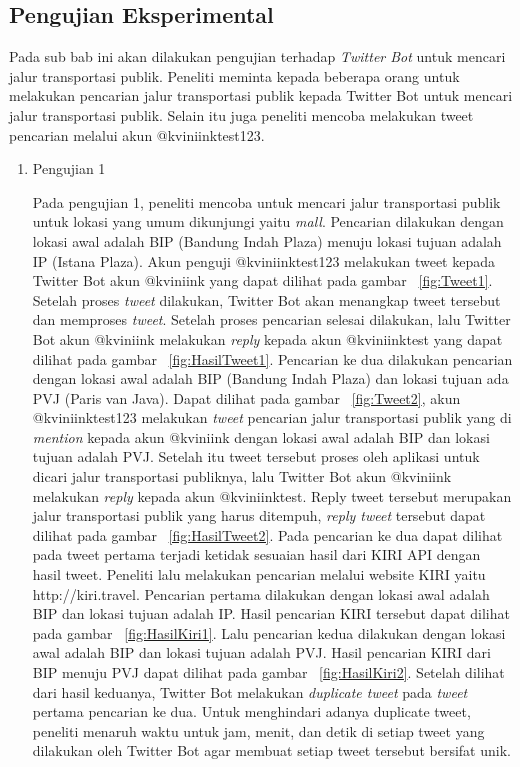 \subsection{Pengujian Eksperimental}
Pada sub bab ini akan dilakukan pengujian terhadap \textit{Twitter Bot} untuk mencari jalur transportasi publik. Peneliti meminta kepada beberapa orang untuk melakukan pencarian jalur transportasi publik kepada Twitter Bot untuk mencari jalur transportasi publik. Selain itu juga peneliti mencoba melakukan tweet pencarian melalui akun @kviniinktest123.

\begin{enumerate}
	\item Pengujian 1
	
	Pada pengujian 1, peneliti mencoba untuk mencari jalur transportasi publik untuk lokasi yang umum dikunjungi yaitu \textit{mall}. Pencarian dilakukan dengan lokasi awal adalah BIP (Bandung Indah Plaza) menuju lokasi tujuan adalah IP (Istana Plaza). Akun penguji @kviniinktest123 melakukan tweet kepada Twitter Bot akun @kviniink yang dapat dilihat pada gambar ~\ref{fig:Tweet1}. Setelah proses \textit{tweet} dilakukan, Twitter Bot akan menangkap tweet tersebut dan memproses \textit{tweet}. Setelah proses pencarian selesai dilakukan, lalu Twitter Bot akun @kviniink melakukan \textit{reply} kepada akun @kviniinktest yang dapat dilihat pada gambar ~\ref{fig:HasilTweet1}. 
	Pencarian ke dua dilakukan pencarian dengan lokasi awal adalah BIP (Bandung Indah Plaza) dan lokasi tujuan ada PVJ (Paris van Java). Dapat dilihat pada gambar ~\ref{fig:Tweet2}, akun @kviniinktest123 melakukan \textit{tweet} pencarian jalur transportasi publik yang di \textit{mention} kepada akun @kviniink dengan lokasi awal adalah BIP dan lokasi tujuan adalah PVJ. Setelah itu tweet tersebut proses oleh aplikasi untuk dicari jalur transportasi publiknya, lalu Twitter Bot akun @kviniink melakukan \textit{reply} kepada akun @kviniinktest. Reply tweet tersebut merupakan jalur transportasi publik yang harus ditempuh, \textit{reply tweet} tersebut dapat dilihat pada gambar ~\ref{fig:HasilTweet2}. Pada pencarian ke dua dapat dilihat pada tweet pertama terjadi ketidak sesuaian hasil dari KIRI API dengan hasil tweet.
	Peneliti lalu melakukan pencarian melalui website KIRI yaitu http://kiri.travel. Pencarian pertama dilakukan dengan lokasi awal adalah BIP dan lokasi tujuan adalah IP. Hasil pencarian KIRI tersebut dapat dilihat pada gambar ~\ref{fig:HasilKiri1}. Lalu pencarian kedua dilakukan dengan lokasi awal adalah BIP dan lokasi tujuan adalah PVJ. Hasil pencarian KIRI dari BIP menuju PVJ dapat dilihat pada gambar ~\ref{fig:HasilKiri2}. Setelah dilihat dari hasil keduanya, Twitter Bot melakukan \textit{duplicate tweet} pada \textit{tweet} pertama pencarian ke dua. Untuk menghindari adanya duplicate tweet, peneliti menaruh waktu untuk jam, menit, dan detik di setiap tweet yang dilakukan oleh Twitter Bot agar membuat setiap tweet tersebut bersifat unik.
	

\end{enumerate}

